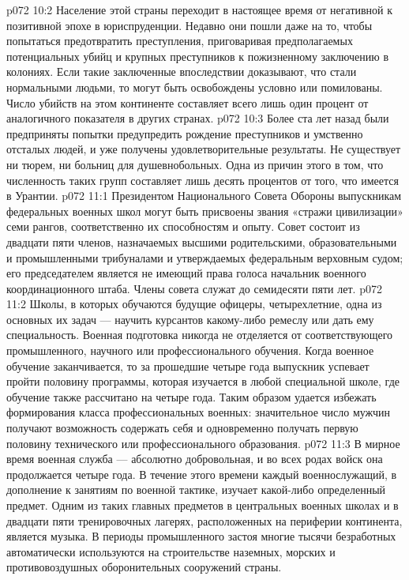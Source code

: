 \vs p072 10:2 Население этой страны переходит в настоящее время от негативной к позитивной эпохе в юриспруденции. Недавно они пошли даже на то, чтобы попытаться предотвратить преступления, приговаривая предполагаемых потенциальных убийц и крупных преступников к пожизненному заключению в колониях. Если такие заключенные впоследствии доказывают, что стали нормальными людьми, то могут быть освобождены условно или помилованы. Число убийств на этом континенте составляет всего лишь один процент от аналогичного показателя в других странах.
\vs p072 10:3 Более ста лет назад были предприняты попытки предупредить рождение преступников и умственно отсталых людей, и уже получены удовлетворительные результаты. Не существует ни тюрем, ни больниц для душевнобольных. Одна из причин этого в том, что численность таких групп составляет лишь десять процентов от того, что имеется в Урантии.
\vs p072 11:1 Президентом Национального Совета Обороны выпускникам федеральных военных школ могут быть присвоены звания «стражи цивилизации» семи рангов, соответственно их способностям и опыту. Совет состоит из двадцати пяти членов, назначаемых высшими родительскими, образовательными и промышленными трибуналами и утверждаемых федеральным верховным судом; его председателем является не имеющий права голоса начальник военного координационного штаба. Члены совета служат до семидесяти пяти лет.
\vs p072 11:2 Школы, в которых обучаются будущие офицеры, четырехлетние, одна из основных их задач --- научить курсантов какому\hyp{}либо ремеслу или дать ему специальность. Военная подготовка никогда не отделяется от соответствующего промышленного, научного или профессионального обучения. Когда военное обучение заканчивается, то за прошедшие четыре года выпускник успевает пройти половину программы, которая изучается в любой специальной школе, где обучение также рассчитано на четыре года. Таким образом удается избежать формирования класса профессиональных военных: значительное число мужчин получают возможность содержать себя и одновременно получать первую половину технического или профессионального образования.
\vs p072 11:3 В мирное время военная служба --- абсолютно добровольная, и во всех родах войск она продолжается четыре года. В течение этого времени каждый военнослужащий, в дополнение к занятиям по военной тактике, изучает какой\hyp{}либо определенный предмет. Одним из таких главных предметов в центральных военных школах и в двадцати пяти тренировочных лагерях, расположенных на периферии континента, является музыка. В периоды промышленного застоя многие тысячи безработных автоматически используются на строительстве наземных, морских и противовоздушных оборонительных сооружений страны.

